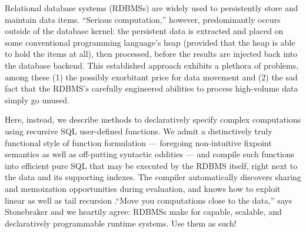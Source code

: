 Relational database systems (RDBMSs) are widely used to persistently store and maintain data items.  “Serious computation,” however, predominantly occurs outside of the database kernel: the persistent data is extracted and placed on some conventional programming language’s heap (provided that the heap is able to hold the items at all), then processed, before the results are injected back into the database backend. This established approach exhibits a plethora of problems, among these (1) the possibly exorbitant price for data movement and (2) the sad fact that the RDBMS’s carefully engineered abilities to process high-volume data simply go unused.

Here, instead, we describe methods to declaratively specify complex computations using recursive SQL user-defined functions. We admit a distinctively truly functional style of function formulation — foregoing non-intuitive fixpoint semantics as well as off-putting syntactic oddities — and compile such functions into efficient pure SQL that may be executed by the RDBMS itself, right next to the data and its supporting indexes.  The compiler automatically discovers sharing and memoization opportunities during evaluation, and knows how to exploit linear as well as tail recursion .“Move you computations close to the data,” says Stonebraker and we heartily agree: RDBMSs make for capable, scalable, and declaratively programmable runtime systems.  Use them as such!
